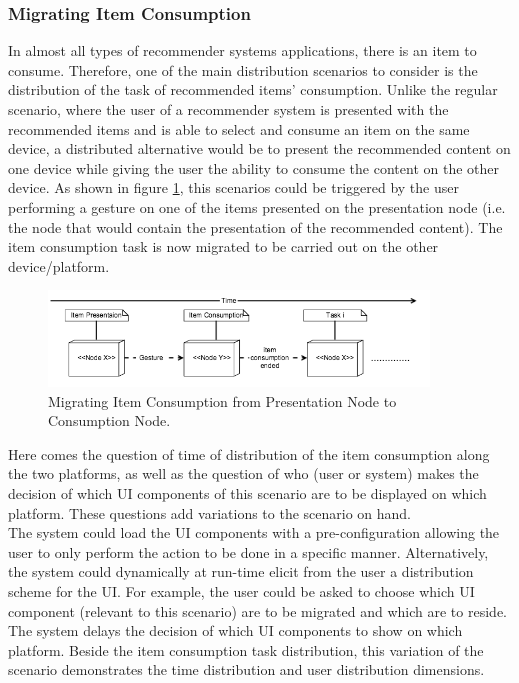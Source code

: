 \subsubsection{Migrating Item Consumption}                    
In almost all types of recommender systems applications, there is an item to consume. Therefore, one of the main distribution scenarios to consider is the distribution of the task of recommended items' consumption. Unlike the regular scenario, where the user of a recommender system is presented with the recommended items and is able to select and consume an item on the same device, a distributed alternative would be to present the recommended content on one device while giving the user the ability to consume the content on the other device. As shown in figure \ref{fig:figure31}, this scenarios could be triggered by the user performing a gesture on one of the items presented on the presentation node (i.e. the node that would contain the presentation of the recommended content). The item consumption task is now migrated to be carried out on the other device/platform. 
\begin{figure}[h]
\includegraphics[width=0.9\textwidth, inner, center]{generic1}
\caption{Migrating Item Consumption from Presentation Node to Consumption Node.}
\label{fig:figure31}
\end{figure}
Here comes the question of time of distribution of the item consumption along the two platforms, as well as the question of who (user or system) makes the decision of which UI components of this scenario are to be displayed on which platform. These questions add variations to the scenario on hand.\\
The system could load the UI components with a pre-configuration allowing the user to only perform the action to be done in a specific manner. Alternatively, the system could dynamically at run-time elicit from the user a distribution scheme for the UI. For example, the user could be asked to choose which UI component (relevant to this scenario) are to be migrated and which are to reside. The system delays the decision of which UI components to show on which platform. Beside the item consumption task distribution, this variation of the scenario demonstrates the time distribution and user distribution dimensions.
      
